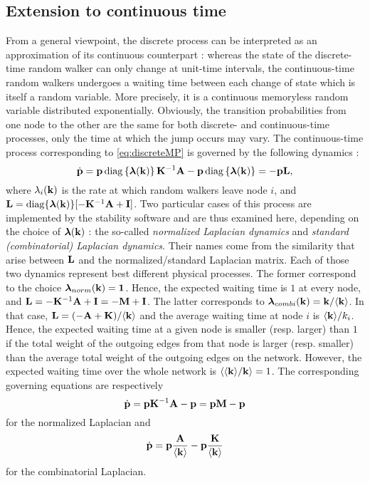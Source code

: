 \subsection{Extension to continuous time}
From a general viewpoint, the discrete process can be interpreted as an approximation of its continuous counterpart : whereas the state of the discrete-time random walker can only change at unit-time intervals, the continuous-time random walkers undergoes a waiting time between each change of state which is itself a random variable. More precisely, it is a continuous memoryless random variable distributed exponentially. Obviously, the transition probabilities from one node to the other are the same for both discrete- and continuous-time processes, only the time at which the jump occurs may vary. The continuous-time process corresponding to \eqref{eq:discreteMP} is governed by the following dynamics :
\begin{equation} \label{eq:continuousMP_general}
    	\dot{\mathbf p} = \mathbf p \operatorname{diag}\left\{\boldsymbol \lambda(\mathbf k)\right\} \mathbf K^{-1} \mathbf A - \mathbf p \operatorname{diag}\left\{\boldsymbol \lambda(\mathbf k)\right\} = -\mathbf p \mathbf L,
\end{equation}
where $\lambda_i(\mathbf k)$ is the rate at which random walkers leave node $i$, and $\mathbf L = \operatorname{diag}\{\boldsymbol \lambda(\mathbf k)\}[-\mathbf K^{-1} \mathbf A + \mathbf I]$. Two particular cases of this process are implemented by the stability software and are thus examined here, depending on the choice of $\boldsymbol \lambda(\mathbf k)$ : the so-called \textit{normalized Laplacian dynamics} and \textit{standard (combinatorial) Laplacian dynamics}. Their names come from the similarity that arise between $\mathbf L$ and the normalized/standard Laplacian matrix. Each of those two dynamics represent best different physical processes. The former correspond to the choice $\boldsymbol \lambda_{norm}(\mathbf k) = \mathbf 1$. Hence, the expected waiting time is $1$ at every node, and $\mathbf L = -\mathbf K^{-1} \mathbf A + \mathbf I = -\mathbf M + \mathbf I$. The latter corresponds to $\boldsymbol \lambda_{combi}(\mathbf k) = \mathbf k/\langle \mathbf k \rangle$. In that case, $\mathbf L = (-\mathbf A + \mathbf K)/\langle \mathbf k \rangle$ and the average waiting time at node $i$ is $\langle \mathbf k \rangle/k_i$. Hence, the expected waiting time at a given node is smaller (resp. larger) than $1$ if the total weight of the outgoing edges from that node is larger (resp. smaller) than the average total weight of the outgoing edges on the network. However, the expected waiting time over the whole network is $\langle \langle \mathbf k \rangle/\mathbf k \rangle = 1$. The corresponding governing equations are respectively 
\begin{equation} \label{eq:continuousMP_norm}
	\dot{\mathbf p} = \mathbf p \mathbf K^{-1} \mathbf A - \mathbf p = \mathbf p \mathbf M - \mathbf p
\end{equation}
for the normalized Laplacian and
\begin{equation} \label{eq:continuousMP_combi}
    	\dot{\mathbf p} = \mathbf p \frac{\mathbf A}{\langle \mathbf k \rangle} - \mathbf p\frac{\mathbf K}{\langle \mathbf k \rangle}
\end{equation}
for the combinatorial Laplacian.

